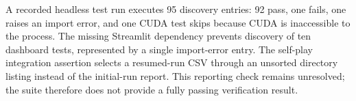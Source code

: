 A recorded headless test run executes 95 discovery entries: 92 pass, one fails, one raises an import error, and one CUDA test skips because CUDA is inaccessible to the process. The missing Streamlit dependency prevents discovery of ten dashboard tests, represented by a single import-error entry. The self-play integration assertion selects a resumed-run CSV through an unsorted directory listing instead of the initial-run report. This reporting check remains unresolved; the suite therefore does not provide a fully passing verification result.
